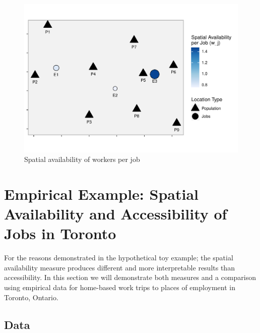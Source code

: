 \documentclass[]{elsarticle} %
\begin{document}
\begin{figure}
\includegraphics[width=1\linewidth]{Spatial-Availability_files/figure-latex/toy-example-availability-workers-per-job-1} \caption{\label{fig:toy-example-availability-workers-per-job}Spatial availability of workers per job}\label{fig:toy-example-availability-workers-per-job}
\end{figure}

\hypertarget{empirical-example-spatial-availability-and-accessibility-of-jobs-in-toronto}{%
\section{Empirical Example: Spatial Availability and Accessibility of
Jobs in
Toronto}\label{empirical-example-spatial-availability-and-accessibility-of-jobs-in-toronto}}

For the reasons demonstrated in the hypothetical toy example; the
spatial availability measure produces different and more interpretable
results than accessibility. In this section we will demonstrate both
measures and a comparison using empirical data for home-based work trips
to places of employment in Toronto, Ontario.

\hypertarget{data}{%
\subsection{Data}\label{data}}
\end{document}
